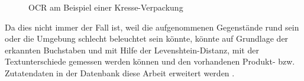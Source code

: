 \begin{figure}[ht]
	\centering
	\caption{OCR am Beispiel einer Kresse-Verpackung}
	\label{img:ocr}
\end{figure}

Da dies nicht immer der Fall ist, weil die aufgenommenen
Gegenstände rund sein oder die Umgebung schlecht beleuchtet sein
könnte, könnte auf Grundlage der erkannten Buchstaben und mit Hilfe
der Levenshtein-Distanz, mit der Textunterschiede gemessen werden
können und den vorhandenen Produkt- bzw. Zutatendaten in der Datenbank
diese Arbeit erweitert werden \cite{dlph10, shs11, kac12}.
